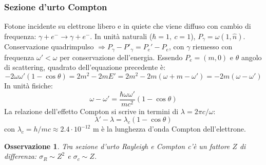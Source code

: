 \documentclass[10pt, a4paper]{scrartcl}
\numberwithin{equation}{subsection}
\theoremstyle{style1}
\newtheorem{osservazione}{Osservazione}[section]
\begin{document}
\subsubsection{Sezione d'urto Compton}
Fotone incidente su elettrone libero e in quiete che viene diffuso con cambio di frequenza: $\gamma + e^- \to \gamma+e^-$. In unit\`a naturali ($\hbar  =1,\ c = 1$), $P_\gamma = \omega (1 , \hat{n})$. Conservazione quadrimpulso $\Rightarrow P_\gamma - P'_\gamma = P_e ' - P_e$, con $\gamma$ riemesso con frequenza $\omega' < \omega$ per conservazione dell'energia. Essendo $P_e = (m,0)$ e $\theta $ angolo di scattering, quadrato dell'equazione precedente \`e:
\begin{equation}
	-2 \omega \omega' ( 1- \cos\theta ) = 2m^2 - 2mE' = 2m^2 - 2m(\omega + m - \omega') = -2m(\omega - \omega')
\end{equation}
In unit\`a fisiche:
\begin{equation}
	\omega - \omega ' =  \frac{\hbar \omega\omega'}{mc^2}(1-\cos\theta )
\end{equation}
La relazione dell'effetto Compton si scrive in termini di $\lambda  = 2\pi c / \omega$:
\begin{equation}
	\lambda ' - \lambda  = \lambda _c (1-\cos\theta )
\end{equation}
con $\lambda _c = h / mc \approx 2.4 \cdot 10^{-12} $ m \`e la lunghezza d'onda Compton dell'elettrone.
\begin{osservazione}
	Tra sezione d'urto Rayleigh e Compton c'\`e un fattore $Z$ di differenza: $\sigma _R \sim Z^2$ e $\sigma _c \sim Z$.
\end{osservazione}
\end{document}

